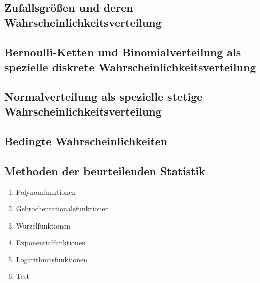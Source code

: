 \documentclass{article}
\begin{document}
	\subsection{Zufallsgrößen und deren Wahrscheinlichkeitsverteilung}
	\subsection{Bernoulli-Ketten und Binomialverteilung als spezielle diskrete Wahrscheinlichkeitsverteilung}
	\subsection{Normalverteilung als spezielle stetige Wahrscheinlichkeitsverteilung}
	\subsection{Bedingte Wahrscheinlichkeiten}
	\subsection{Methoden der beurteilenden Statistik}


\begin{enumerate}
    \item Polynomfunktionen
    \item Gebrochenrationalefunktionen
    \item Wurzelfunktionen
    \item Exponentialfunktionen
    \item Logarithmusfunktionen
    \item Test
\end{enumerate}
\end{document}
